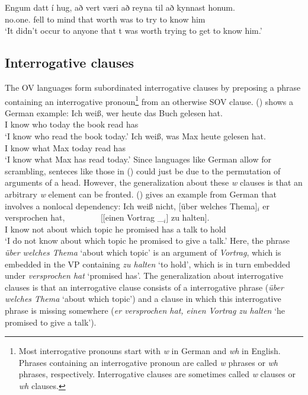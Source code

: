\citet[]{Maling90a-u}
\eal
\ex 
\gll Engum         datt í hug,  að   vert  væri að reyna til     að kynnast honum.\\
     no.one.\DAT{} fell to mind that worth was  to try   \PREP{} to know    him\\
\glt `It didn't occur to anyone that t was worth trying to get to know him.'
\zl

\subsection{Interrogative clauses}


The OV languages form subordinated interrogative clauses by preposing a phrase containing an
interrogative pronoun\footnote{
Most interrogative pronouns start with \emph{w} in German and \emph{wh} in English. Phrases
containing an interrogative pronoun are called \emph{w} phrases or \emph{wh} phrases,
respectively. Interrogative clauses are sometimes called \emph{w} clauses or \emph{wh} clauses.
} from an
otherwise SOV clause. () shows a German example:
\eal
\ex 
\gll Ich weiß, wer heute das Buch gelesen hat.\\
     I know    who today the book read has\\
\glt `I know who read the book today.'
\ex 
\gll Ich weiß, was Max heute gelesen hat.\\
     I know    what Max today read has\\
\glt `I know what Max has read today.'
\zl
Since languages like German allow for scrambling, senteces like those in () could just be due
to the permutation of arguments of a head. However, the generalization about these \emph{w} clauses
is that an arbitrary \emph{w} element can be fronted. () gives an example from German that
involves a nonlocal dependency:
\ea
\gll Ich weiß nicht, [über welches Thema]$_i$ er versprochen hat,~~~~~~~~ [[einen Vortrag \_$_i$] zu halten].\\
     I know not      \spacebr about which topic he promised has \hspaceThis{[[}a talk to  hold\\
\glt `I do not know about which topic he promised to give a talk.'
\z
Here, the phrase \emph{über welches Thema} `about which topic' is an argument of \emph{Vortrag},
which is embedded in the VP containing \emph{zu halten} `to hold', which is in turn embedded under
\emph{versprochen hat} `promised has'. The generalization about interrogative clauses is that an
interrogative clause consists of a interrogative phrase (\emph{über welches Thema} `about which
topic') and a clause in which this interrogative phrase is missing somewhere (\emph{er versprochen
  hat, einen Vortrag zu halten} `he promised to give a talk').

